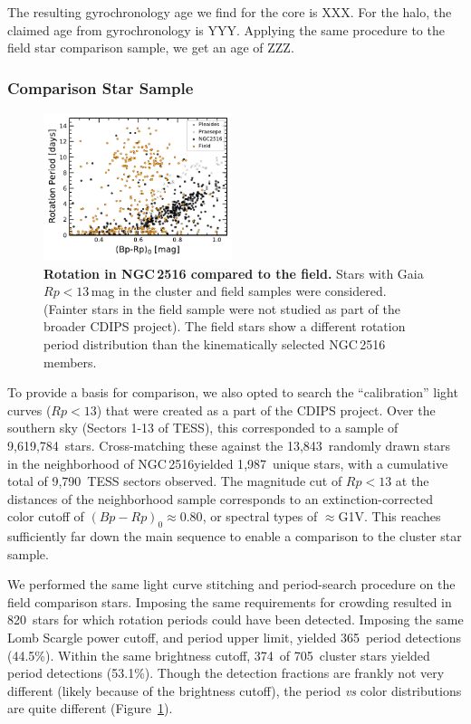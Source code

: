 \documentclass[12pt,twocolumn,tighten]{aastex63}
\newcommand{\cn}{NGC\,2516} %
\newcommand{\ncalibration}{9{,}619{,}784\ } %
\newcommand{\nnbhd}{13{,}843\ } %
\newcommand{\nnbhdcaliblc}{9{,}790\ } %
\newcommand{\nnbhdcalibstar}{1{,}987\ } %
\newcommand{\ncompstardenominator}{820\ } %
\newcommand{\ncompstarnumerator}{365\ } %
\newcommand{\ncompfrac}{44.5\%} %
\newcommand{\nautovscompstardenominator}{705\ } %
\newcommand{\nautovscompstarnumerator}{374\ } %
\newcommand{\nautofrac}{53.1\%} %
\begin{document}
The resulting gyrochronology age we find for the core is XXX.
For the halo, the claimed age from gyrochronology is YYY.
Applying the same procedure to the field star comparison sample,
we get an age of ZZZ.

\subsubsection{Comparison Star Sample}

\begin{figure}[t]
	\begin{center}
		\leavevmode
    \includegraphics[width=0.49\textwidth]{f9.pdf}
	\end{center}
	\vspace{-0.7cm}
	\caption{ {\bf Rotation in NGC\,2516 compared to the field.}
  Stars with Gaia $Rp<13$\,mag in the cluster and field samples were
  considered. (Fainter stars in the field sample were not studied as part
  of the broader CDIPS project).
  The field stars show a different rotation period distribution than
  the kinematically selected NGC\,2516 members.
  \label{fig:compstar}
	}
\end{figure}

To provide a basis for comparison, we also opted to search the
``calibration'' light curves ($Rp<13$) that were created as a part of
the CDIPS project.  Over the southern sky (Sectors 1-13 of TESS), this
corresponded to a sample of \ncalibration stars.  Cross-matching these
against the \nnbhd randomly drawn stars in the neighborhood of \cn yielded
\nnbhdcalibstar unique stars, with a cumulative total of \nnbhdcaliblc TESS
sectors observed.
The magnitude cut of $Rp<13$ at the distances of the neighborhood sample
corresponds to an extinction-corrected color cutoff of $(Bp-Rp)_0
\approx 0.80$, or spectral types of $\approx$G1V.
This reaches sufficiently far down the main sequence to enable a
comparison to the cluster star sample.

We performed the same light curve stitching and period-search
procedure on the field comparison stars.
Imposing the same requirements for crowding resulted in
\ncompstardenominator stars for which rotation periods could have been
detected.
Imposing the same Lomb Scargle power cutoff, and period upper limit,
yielded \ncompstarnumerator period detections (\ncompfrac).
Within the same brightness cutoff, 
\nautovscompstarnumerator of \nautovscompstardenominator cluster stars
yielded period detections (\nautofrac).
Though the detection fractions are frankly not very different
(likely because of the brightness cutoff), the period {\it
vs} color distributions are quite different
(Figure~\ref{fig:compstar}).
\end{document}
